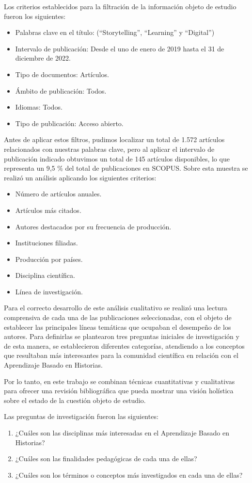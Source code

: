 Los criterios establecidos para la filtración de la información objeto de estudio fueron los siguientes:

\begin{itemize}
	\item
	Palabras clave en el título: (\enquote{Storytelling}, \enquote{Learning} y
	\enquote{Digital})
	\item
	Intervalo de publicación: Desde el uno de enero de 2019 hasta el 31 de
	diciembre de 2022.
	\item
	Tipo de documentos: Artículos.
	\item
	Ámbito de publicación: Todos.
	\item
	Idiomas: Todos.
	\item
	Tipo de publicación: Acceso abierto.
\end{itemize}

Antes de aplicar estos filtros, pudimos localizar un total de 1.572 artículos relacionados con nuestras palabras clave, pero al aplicar el intervalo de publicación indicado obtuvimos un total de 145 artículos disponibles, lo que representa un 9,5 \% del total de publicaciones en SCOPUS. Sobre esta muestra se realizó un análisis aplicando los siguientes criterios:

\begin{itemize}
	\item
	Número de artículos anuales.
	\item
	Artículos más citados.
	\item
	Autores destacados por su frecuencia de producción.
	\item
	Instituciones filiadas.
	\item
	Producción por países.
	\item
	Disciplina científica.
	\item
	Línea de investigación.
\end{itemize}

Para el correcto desarrollo de este análisis cualitativo se realizó una lectura comprensiva de cada una de las publicaciones seleccionadas, con el objeto de establecer las principales líneas temáticas que ocupaban el desempeño de los autores. Para definirlas se plantearon tres preguntas iniciales de investigación y de esta manera, se establecieron diferentes categorías, atendiendo a los conceptos que resultaban más interesantes para la comunidad científica en relación con el Aprendizaje Basado en Historias.

Por lo tanto, en este trabajo se combinan técnicas cuantitativas y cualitativas para ofrecer una revisión bibliográfica que pueda mostrar una visión holística sobre el estado de la cuestión objeto de estudio.

Las preguntas de investigación fueron las siguientes:

\begin{enumerate}
	\def\labelenumi{\arabic{enumi}.}
	\item
	¿Cuáles son las disciplinas más interesadas en el Aprendizaje Basado
	en Historias?
	\item
	¿Cuáles son las finalidades pedagógicas de cada una de ellas?
	\item
	¿Cuáles son los términos o conceptos más investigados en cada una de
	ellas?
\end{enumerate}
